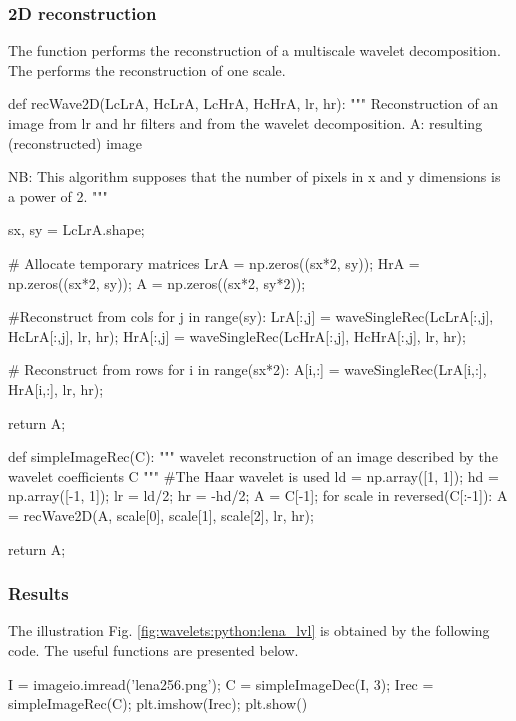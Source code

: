 \subsubsection{2D reconstruction}
The  function performs the reconstruction of a multiscale wavelet decomposition. The  performs the reconstruction of one scale.

\begin{python}
def recWave2D(LcLrA, HcLrA, LcHrA, HcHrA, lr, hr):
    """
    Reconstruction of an image from lr and hr filters and from the wavelet decomposition.
    A: resulting (reconstructed) image
    
    NB: This algorithm supposes that the number of pixels in x and y dimensions is a power of 2.
    """

    sx, sy = LcLrA.shape;
    
    # Allocate temporary matrices
    LrA = np.zeros((sx*2, sy));
    HrA = np.zeros((sx*2, sy));
    A   = np.zeros((sx*2, sy*2));
    
    #Reconstruct from cols
    for j in range(sy):
        LrA[:,j] = waveSingleRec(LcLrA[:,j], HcLrA[:,j], lr, hr);
        HrA[:,j] = waveSingleRec(LcHrA[:,j], HcHrA[:,j], lr, hr);
    
    # Reconstruct from rows
    for i in range(sx*2):
        A[i,:] = waveSingleRec(LrA[i,:], HrA[i,:], lr, hr);
        
    return A;
\end{python}

\begin{python}def simpleImageRec(C):
    """
    wavelet reconstruction of an image described by the wavelet coefficients C 
    """
    #The Haar wavelet is used
    ld = np.array([1, 1]);
    hd = np.array([-1, 1]);
    lr = ld/2;
    hr = -hd/2;
    A = C[-1];
    for scale in reversed(C[:-1]):
        A = recWave2D(A, scale[0], scale[1], scale[2], lr, hr);
        
    return A;
\end{python}

\subsubsection{Results}
The illustration Fig. \ref{fig:wavelets:python:lena_lvl} is obtained by the following code. The useful functions are presented below.
\begin{sh}
I = imageio.imread('lena256.png');
C = simpleImageDec(I, 3);
Irec = simpleImageRec(C);
plt.imshow(Irec);
plt.show()
\end{sh}


